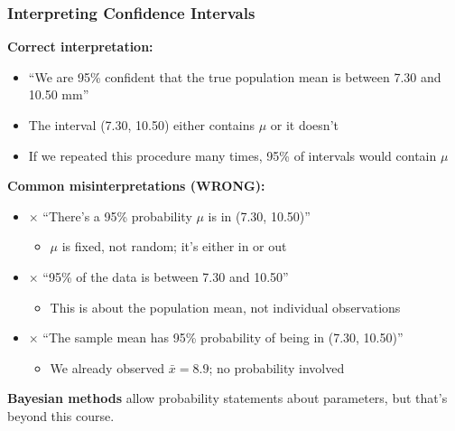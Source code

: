\documentclass{beamer}
\begin{document}
\begin{frame}
\frametitle{Interpreting Confidence Intervals}
\textbf{Correct interpretation:}
\begin{itemize}
\item ``We are 95\% confident that the true population mean is between 7.30 and 10.50 mm''
\item The interval (7.30, 10.50) either contains $\mu$ or it doesn't
\item If we repeated this procedure many times, 95\% of intervals would contain $\mu$
\end{itemize}

\vspace{0.5cm}
\textbf{Common misinterpretations (WRONG):}
\begin{itemize}
\item $\times$ ``There's a 95\% probability $\mu$ is in (7.30, 10.50)''
  \begin{itemize}
  \item $\mu$ is fixed, not random; it's either in or out
  \end{itemize}
\item $\times$ ``95\% of the data is between 7.30 and 10.50''
  \begin{itemize}
  \item This is about the population mean, not individual observations
  \end{itemize}
\item $\times$ ``The sample mean has 95\% probability of being in (7.30, 10.50)''
  \begin{itemize}
  \item We already observed $\bar{x} = 8.9$; no probability involved
  \end{itemize}
\end{itemize}

\vspace{0.3cm}
\textbf{Bayesian methods} allow probability statements about parameters, but that's beyond this course.
\end{frame}
\end{document}
